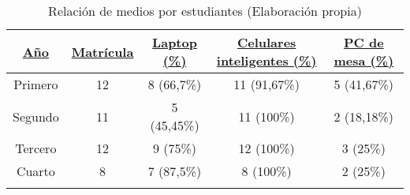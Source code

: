 \begin{longtable}{|c|c|c|c|c|}
	\hline
	 \underline{\textbf{Año}} & \underline{\textbf{Matrícula}} & \underline{\textbf{Laptop (\%)}} & \underline{\textbf{Celulares inteligentes (\%)}} & \underline{\textbf{PC de mesa (\%)}}\\ \hline
	 Primero & 12 & 8 (66,7\%)& 11 (91,67\%) & 5 (41,67\%)\\ \hline
	  Segundo & 11 & 5 (45,45\%) &11 (100\%) & 2 (18,18\%)\\ \hline
	   Tercero & 12 & 9 (75\%)&12 (100\%) & 3 (25\%)\\ \hline
	    Cuarto & 8 & 7 (87,5\%) & 8 (100\%) & 2 (25\%)\\ 
	\hline
	\caption{Relación de medios por estudiantes (Elaboración propia)}
\end{longtable}